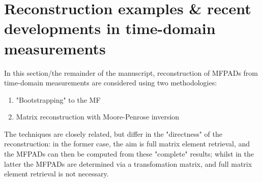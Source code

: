 \section{Reconstruction examples & recent developments in time-domain measurements}

In this section/the remainder of the manuscript, reconstruction of MFPADs from time-domain measurements are considered using two methodologies:

\begin{enumerate}
\item "Bootstrapping" to the MF \cite{hockett2018QMP1,hockett2018QMP2,marceau2017MolecularFrameReconstruction}
\item Matrix reconstruction with Moore-Penrose inversion \cite{gregory2021MolecularFramePhotoelectron}
\end{enumerate}

The techniques are closely related, but differ in the "directness" of the reconstruction: in the former case, the aim is full matrix element retrieval, and the MFPADs can then be computed from these "complete" results; whilst in the latter the MFPADs are determined via a transfomation matrix, and full matrix element retrieval is not necessary.